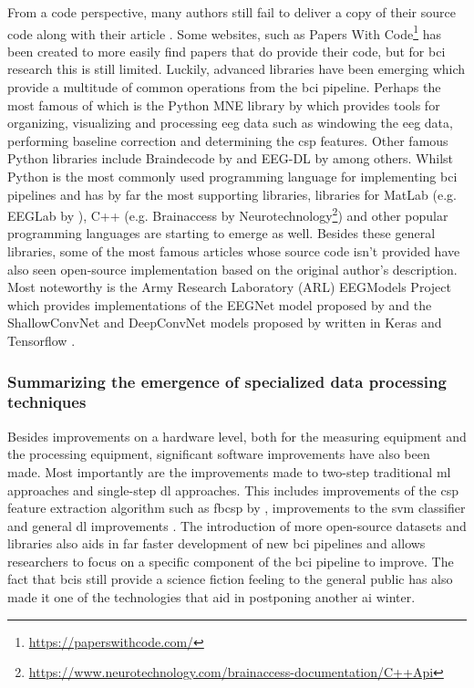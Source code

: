 From a code perspective, many authors still fail to deliver a copy of their source code along with their article \citep{bci_review_arnau}.
Some websites, such as Papers With Code\footnote{\url{https://paperswithcode.com/}} has been created to more easily find papers that do provide their code, but for \gls{bci} research this is still limited.
Luckily, advanced libraries have been emerging which provide a multitude of common operations from the \gls{bci} pipeline.
Perhaps the most famous of which is the Python MNE library by \citet{mne} which provides tools for organizing, visualizing and processing \gls{eeg} data such as windowing the \gls{eeg} data, performing baseline correction and determining the \gls{csp} features.
Other famous Python libraries include Braindecode by \citet{eeg_model_hbm} and EEG-DL by \citet{eeg_model_esi, eeg_dl_paper2, eeg_dl_paper3, eeg_dl_paper4} among others.
Whilst Python is the most commonly used programming language for implementing \gls{bci} pipelines and has by far the most supporting libraries, libraries for MatLab (e.g. EEGLab by \cite{eeglab_matlab}), C++ (e.g. Brainaccess by Neurotechnology\footnote{\url{https://www.neurotechnology.com/brainaccess-documentation/C++Api}}) and other popular programming languages are starting to emerge as well.
Besides these general libraries, some of the most famous articles whose source code isn't provided have also seen open-source implementation based on the original author's description.
Most noteworthy is the Army Research Laboratory (ARL) EEGModels Project which provides implementations of the EEGNet model proposed by \citet{eeg_model_eegnet} and the ShallowConvNet and DeepConvNet models proposed by \citet{eeg_model_hbm} written in Keras and Tensorflow \citep[Python DL libraries by][]{keras, tensorflow}.


\subsubsection{Summarizing the emergence of specialized data processing techniques}
\label{subsubsec:bci_gaining_popularity_improved_data_processing_summary}

Besides improvements on a hardware level, both for the measuring equipment and the processing equipment, significant software improvements have also been made.
Most importantly are the improvements made to two-step traditional \gls{ml} approaches and single-step \gls{dl} approaches.
This includes improvements of the \gls{csp} feature extraction algorithm such as \gls{fbcsp} by \citet{eeg_model_fbcsp}, improvements to the \gls{svm} classifier \citep{svm_extension1, svm_history} and general \gls{dl} improvements \citep{tl_cnn_eeg, bci_review_arnau, rl_activation_function_compare}.
The introduction of more open-source datasets and libraries also aids in far faster development of new \gls{bci} pipelines and allows researchers to focus on a specific component of the \gls{bci} pipeline to improve.
The fact that \glspl{bci} still provide a science fiction feeling to the general public has also made it one of the technologies that aid in postponing another \gls{ai} winter.

